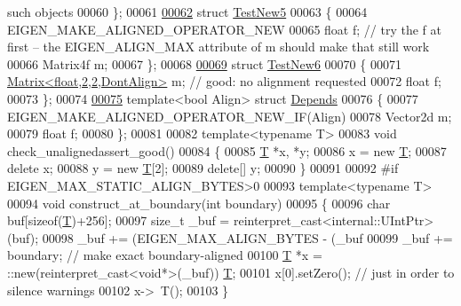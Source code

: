 \begin{DoxyCode}
{       such objects}
00060 \};
00061 
\hyperlink{struct_test_new5}{00062} \textcolor{keyword}{struct }\hyperlink{struct_test_new5}{TestNew5}
00063 \{
00064   EIGEN\_MAKE\_ALIGNED\_OPERATOR\_NEW
00065   \textcolor{keywordtype}{float} f; \textcolor{comment}{// try the f at first -- the EIGEN\_ALIGN\_MAX attribute of m should make that still work}
00066   Matrix4f m;
00067 \};
00068 
\hyperlink{struct_test_new6}{00069} \textcolor{keyword}{struct }\hyperlink{struct_test_new6}{TestNew6}
00070 \{
00071   \hyperlink{group___core___module}{Matrix<float,2,2,DontAlign>} m; \textcolor{comment}{// good: no alignment requested}
00072   \textcolor{keywordtype}{float} f;
00073 \};
00074 
\hyperlink{struct_depends}{00075} \textcolor{keyword}{template}<\textcolor{keywordtype}{bool} Align> \textcolor{keyword}{struct }\hyperlink{struct_depends}{Depends}
00076 \{
00077   EIGEN\_MAKE\_ALIGNED\_OPERATOR\_NEW\_IF(Align)
00078   Vector2d m;
00079   \textcolor{keywordtype}{float} f;
00080 \};
00081 
00082 \textcolor{keyword}{template}<\textcolor{keyword}{typename} T>
00083 \textcolor{keywordtype}{void} check\_unalignedassert\_good()
00084 \{
00085   \hyperlink{group___sparse_core___module}{T} *x, *y;
00086   x = \textcolor{keyword}{new} \hyperlink{group___sparse_core___module}{T};
00087   \textcolor{keyword}{delete} x;
00088   y = \textcolor{keyword}{new} \hyperlink{group___sparse_core___module}{T}[2];
00089   \textcolor{keyword}{delete}[] y;
00090 \}
00091 
00092 \textcolor{preprocessor}{#if EIGEN\_MAX\_STATIC\_ALIGN\_BYTES>0}
00093 \textcolor{keyword}{template}<\textcolor{keyword}{typename} T>
00094 \textcolor{keywordtype}{void} construct\_at\_boundary(\textcolor{keywordtype}{int} boundary)
00095 \{
00096   \textcolor{keywordtype}{char} buf[\textcolor{keyword}{sizeof}(\hyperlink{group___sparse_core___module}{T})+256];
00097   \textcolor{keywordtype}{size\_t} \_buf = \textcolor{keyword}{reinterpret\_cast<}internal::UIntPtr\textcolor{keyword}{>}(buf);
00098   \_buf += (EIGEN\_MAX\_ALIGN\_BYTES - (\_buf %
00099   \_buf += boundary; \textcolor{comment}{// make exact boundary-aligned}
00100   \hyperlink{group___sparse_core___module}{T} *x = ::new(reinterpret\_cast<void*>(\_buf)) \hyperlink{group___sparse_core___module}{T};
00101   x[0].setZero(); \textcolor{comment}{// just in order to silence warnings}
00102   x->~T();
00103 \}

\end{DoxyCode}
